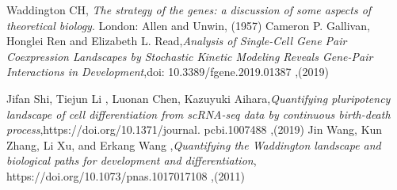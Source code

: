 \begin{thebibliography}{90}             %
\rhead[\fancyplain{}{\bfseries \leftmark}]{\fancyplain{}{\bfseries
\thepage}}

 Waddington CH, \emph{The strategy of the genes: a discussion of some aspects of theoretical biology}. London: Allen and Unwin, (1957)
 Cameron P. Gallivan, Honglei Ren and Elizabeth L. Read,\emph{Analysis of Single-Cell Gene Pair
Coexpression Landscapes by
Stochastic Kinetic Modeling Reveals
Gene-Pair Interactions in
Development},doi: 10.3389/fgene.2019.01387 ,(2019)

 Jifan Shi, Tiejun Li , Luonan Chen, Kazuyuki Aihara,\emph{Quantifying pluripotency landscape of cell
differentiation from scRNA-seq data by
continuous birth-death process},https://doi.org/10.1371/journal.
pcbi.1007488 ,(2019)
 Jin Wang, Kun Zhang, Li Xu, and Erkang Wang ,\emph{Quantifying the Waddington landscape and biological
paths for development and differentiation}, https://doi.org/10.1073/pnas.1017017108 ,(2011)


\end{thebibliography}
